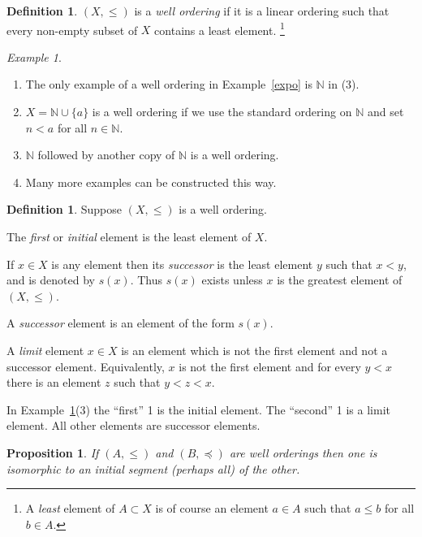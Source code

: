\documentclass[a4paper]{amsart}
\theoremstyle{plain}
\newtheorem{proposition}[theorem]{Proposition}
\theoremstyle{definition}
\newtheorem{definition}[theorem]{Definition}%
\theoremstyle{remark}
\newtheorem{example}[theorem]{Example}
\begin{document}
 \begin{definition} $ (X,\leqslant ) $ is a \emph{well ordering} if it is a linear ordering such that every non-empty subset of $ X $ contains a least element.%
 \footnote{A \emph{least} element of $ A \subset X $ is of course an element $ a \in A$ such that $ a \leqslant b $ for all $ b \in A $.}
   \end{definition}

 \begin{example} \label{woex}\mbox{}
   
\begin{enumerate}
 \item The only example of a well ordering in Example~\ref{expo} is $ \mathbb{N} $  in (3).
   \item  $X =  \mathbb{N}\cup \{a\} $     is a well ordering if we use the standard ordering on $ \mathbb{N} $ and set $ n < a $ for all $ n \in \mathbb{N} $.  
  \item $ \mathbb{N} $ followed by another copy of $ \mathbb{N} $  is a well ordering.
  \item Many more examples can be constructed this way.
 \end{enumerate}
 \end{example}
 
 
\begin{definition} Suppose $(X,\leqslant ) $ is a well ordering.

 The \emph{first} or \emph{initial} element is the least element of $ X $.
 
 If $ x \in X $ is any element then its \emph{successor} is the least element $ y $ such that $ x<y $, and is denoted by $ s(x) $.  Thus $ s(x) $ exists  unless $ x $ is the greatest element of $(X,\leqslant ) $. 

 A \emph{successor} element is an element of the form $ s(x) $.
 
 
 A \emph{limit} element $ x\in X $ is an element which is not the first element and not a successor element.  Equivalently, $ x $ is not the first element and for every $ y < x$  there is an element $ z $ such that $ y < z < x $.
 \end{definition}

  
  In Example~\ref{woex}(3) the ``first'' 1 is the initial element. The ``second'' 1 is a limit element.  All other elements are successor elements.
 
    
  
\begin{proposition} If $ (A,\leqslant) $ and $ (B,  \preccurlyeq ) $ are well orderings then  one is isomorphic to an initial segment (perhaps all) of the other.
\end{proposition}
 
\end{document}
